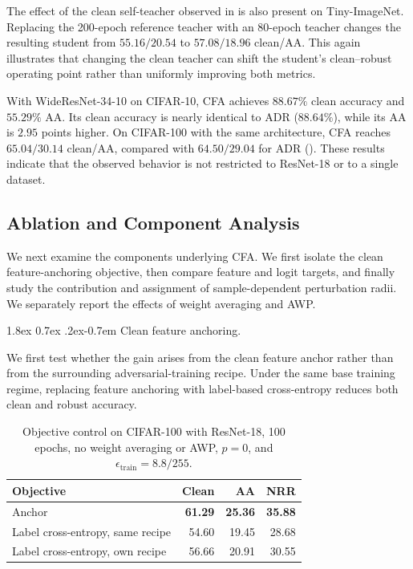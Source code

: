 \documentclass{article} %
\makeatletter
\theoremstyle{plain}
\renewcommand{\paragraph}{\@startsection{paragraph}{4}{\z@}%
  {1.8ex \@plus 0.7ex \@minus .2ex}{-0.7em}%
  {\normalfont\normalsize\bfseries}}
\makeatother
\begin{document}
The effect of the clean self-teacher observed in
 is also present on Tiny-ImageNet.
Replacing the 200-epoch reference teacher with an 80-epoch teacher changes
the resulting student from \(55.16/20.54\) to \(57.08/18.96\)
clean/AA.
This again illustrates that changing the clean teacher can shift the
student's clean--robust operating point rather than uniformly improving both
metrics.

With WideResNet-34-10 on CIFAR-10, CFA achieves \(88.67\%\) clean accuracy
and \(55.29\%\) AA.
Its clean accuracy is nearly identical to ADR
(\(88.64\%\)), while its AA is \(2.95\) points higher.
On CIFAR-100 with the same architecture, CFA reaches
\(65.04/30.14\) clean/AA, compared with \(64.50/29.04\) for ADR
().
These results indicate that the observed behavior is not restricted to
ResNet-18 or to a single dataset.


\subsection{Ablation and Component Analysis}
\label{sec:components}

We next examine the components underlying CFA.
We first isolate the clean feature-anchoring objective, then compare feature
and logit targets, and finally study the contribution and assignment of
sample-dependent perturbation radii.
We separately report the effects of weight averaging and AWP.


\paragraph{Clean feature anchoring.}

We first test whether the gain arises from the clean feature anchor rather
than from the surrounding adversarial-training recipe.
Under the same base training regime, replacing feature anchoring with
label-based cross-entropy reduces both clean and robust accuracy.

\begin{table}[!htbp]
  \centering
  \small
  \setlength{\tabcolsep}{5pt}
  \caption{
  Objective control on CIFAR-100 with ResNet-18, 100 epochs, no weight
  averaging or AWP, \(p=0\), and
  \(\epsilon_{\mathrm{train}}=8.8/255\).
  }
  \label{tab:controls}
  \begin{tabular}{lrrr}
    \toprule
    Objective & Clean & AA & NRR \\
    \midrule
    Anchor
      & \textbf{61.29} & \textbf{25.36} & \textbf{35.88} \\
    Label cross-entropy, same recipe
      & 54.60 & 19.45 & 28.68 \\
    Label cross-entropy, own recipe
      & 56.66 & 20.91 & 30.55 \\
    \bottomrule
  \end{tabular}
\end{table}
\end{document}

